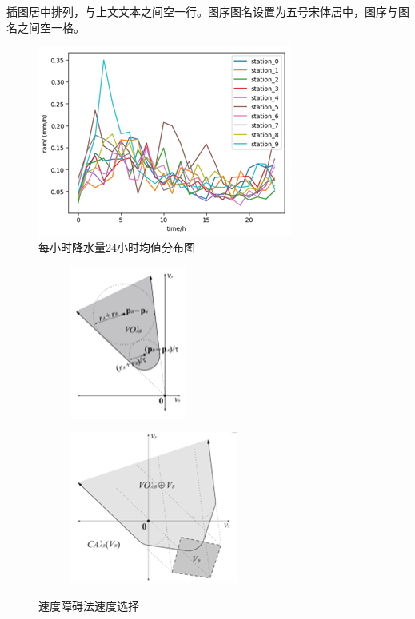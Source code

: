 \begin{spacing}{1.5}
    插图居中排列，与上文文本之间空一行。图序图名设置为五号宋体居中，图序与图名之间空一格。
    
    \begin{figure}[bhp]
        \centering
        \includegraphics[scale=1]{figures/rainfall.png}
        \caption{\wuhao 每小时降水量24小时均值分布图}
        \label{rainfall}
    \end{figure}
    
    \begin{figure}
        \centering
        \begin{subfigure}{0.35\textwidth}
            \includegraphics[width=3.83cm,height=5cm]{figures/speed-barrier-a.png}
        \end{subfigure}
        \begin{subfigure}{0.35\textwidth}
            \includegraphics[height=5cm,width=5.51cm]{figures/speed-barrier-b.png}
        \end{subfigure}
        \caption{\wuhao 速度障碍法速度选择}
        \label{speed}
    \end{figure}
    

\end{spacing}
